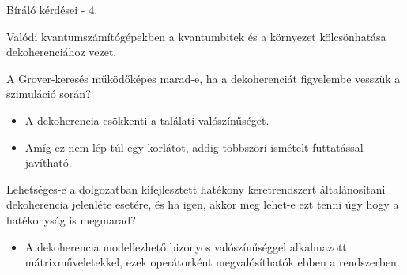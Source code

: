 \documentclass[aspectratio=169]{beamer}
\begin{document}
\begin{frame}{Bíráló kérdései - 4.}

Valódi kvantumszámítógépekben a kvantumbitek és a környezet kölcsönhatása dekoherenciához vezet.

A Grover-keresés működőképes marad-e, ha a dekoherenciát figyelembe vesszük a szimuláció során?
\begin{itemize}
  \item A dekoherencia csökkenti a találati valószínűséget.
  \item Amíg ez nem lép túl egy korlátot, addig többszöri ismételt futtatással javítható.
\end{itemize}
Lehetséges-e a dolgozatban kifejlesztett hatékony keretrendszert általánosítani dekoherencia jelenléte esetére, és ha igen, akkor meg lehet-e ezt tenni úgy hogy a hatékonyság is megmarad?
\begin{itemize}
  \item A dekoherencia modellezhető bizonyos valószínűséggel alkalmazott mátrixműveletekkel, ezek operátorként megvalósíthatók ebben a rendszerben.
\end{itemize}

\end{frame}
\end{document}
